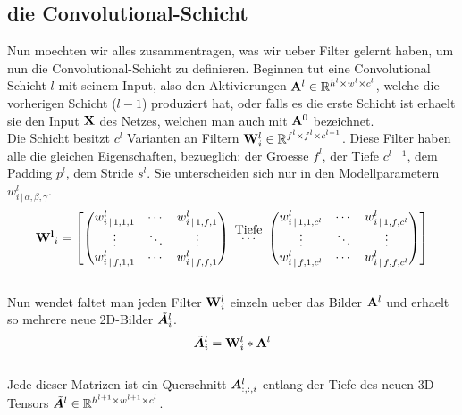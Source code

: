 \subsection{die Convolutional-Schicht}
Nun moechten wir alles zusammentragen, was wir ueber Filter gelernt
haben, um nun die Convolutional-Schicht zu definieren.
\para{}
Beginnen tut eine Convolutional Schicht $l$ mit seinem Input, also den
Aktivierungen $\mathbf{A}^l \in \mathbb{R}^{h^l \times w^l \times c^l}$, welche die vorherigen Schicht ($l-1$) produziert hat,
oder falls es die erste Schicht ist erhaelt sie den Input $\mathbf{X}$ des Netzes,
welchen man auch mit $\mathbf{A}^0$ bezeichnet. \\
Die Schicht besitzt $c^l$ Varianten an Filtern $\mathbf{W}^l_i \in
\mathbb{R}^{f^l \times f^l \times c^{l-1}}$. Diese Filter haben alle die gleichen
Eigenschaften, bezueglich: der Groesse $f^l$, der Tiefe $c^{l-1}$, dem Padding
$p^l$, dem Stride $s^l$. Sie unterscheiden sich nur in den Modellparametern
$w^l_{i\,|\,\alpha,\beta,\gamma}$.
\\
\begin{equation*}
  \ten{W^l}_i =
  \begin{bmatrix}
    \begin{pmatrix}
      w_{i\,|\,1,1,1}^l & \cdots & w_{i\,|\,1,f,1}^l \\
      \vdots & \ddots & \vdots \\
      w_{i\,|\,f,1,1}^l & \cdots & w_{i\,|\,f,f,1}^l
    \end{pmatrix}
    & \stackrel{\mathclap{\normalfont\mbox{Tiefe}}}{\cdots} &
    \begin{pmatrix}
      w_{i\,|\,1,1,c^l}^l & \cdots & w_{i\,|\,1,f,c^l}^l \\
      \vdots & \ddots & \vdots \\
      w_{i\,|\,f,1,c^l}^l & \cdots & w_{i\,|\,f,f,c^l}^l
    \end{pmatrix}
  \end{bmatrix}
\end{equation*}
\\
Nun wendet faltet man jeden Filter $\mathbf{W}_i^l$ einzeln ueber das Bilder
$\mathbf{A}^l$ und erhaelt so mehrere neue 2D-Bilder $\tilde{\bm{A}}_i^l$.
\\
\begin{equation}
  \tilde{\bm{A}}_i^l = \mathbf{W}_i^l * \mathbf{A}^l
\end{equation}
\\
Jede dieser Matrizen ist ein Querschnitt $\tilde{\bm{A}}^l_{:,:,i}$ entlang der
Tiefe des neuen 3D-Tensors $\tilde{\bm{A}}^l \in \mathbb{R}^{h^{l+1} \times w^{l+1} \times c^l}$.
